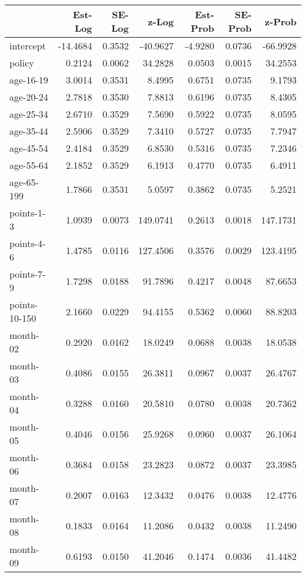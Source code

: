 \documentclass[10pt]{article}
\begin{document}
\begin{table}[ht]
\centering
\begin{tabular}{lrrrrrr}
  \hline
 & Est-Log & SE-Log & z-Log & Est-Prob & SE-Prob & z-Prob \\ 
  \hline
intercept & -14.4684 & 0.3532 & -40.9627 & -4.9280 & 0.0736 & -66.9928 \\ 
  policy & 0.2124 & 0.0062 & 34.2828 & 0.0503 & 0.0015 & 34.2553 \\ 
  age-16-19 & 3.0014 & 0.3531 & 8.4995 & 0.6751 & 0.0735 & 9.1793 \\ 
  age-20-24 & 2.7818 & 0.3530 & 7.8813 & 0.6196 & 0.0735 & 8.4305 \\ 
  age-25-34 & 2.6710 & 0.3529 & 7.5690 & 0.5922 & 0.0735 & 8.0595 \\ 
  age-35-44 & 2.5906 & 0.3529 & 7.3410 & 0.5727 & 0.0735 & 7.7947 \\ 
  age-45-54 & 2.4184 & 0.3529 & 6.8530 & 0.5316 & 0.0735 & 7.2346 \\ 
  age-55-64 & 2.1852 & 0.3529 & 6.1913 & 0.4770 & 0.0735 & 6.4911 \\ 
  age-65-199 & 1.7866 & 0.3531 & 5.0597 & 0.3862 & 0.0735 & 5.2521 \\ 
  points-1-3 & 1.0939 & 0.0073 & 149.0741 & 0.2613 & 0.0018 & 147.1731 \\ 
  points-4-6 & 1.4785 & 0.0116 & 127.4506 & 0.3576 & 0.0029 & 123.4195 \\ 
  points-7-9 & 1.7298 & 0.0188 & 91.7896 & 0.4217 & 0.0048 & 87.6653 \\ 
  points-10-150 & 2.1660 & 0.0229 & 94.4155 & 0.5362 & 0.0060 & 88.8203 \\ 
  month-02 & 0.2920 & 0.0162 & 18.0249 & 0.0688 & 0.0038 & 18.0538 \\ 
  month-03 & 0.4086 & 0.0155 & 26.3811 & 0.0967 & 0.0037 & 26.4767 \\ 
  month-04 & 0.3288 & 0.0160 & 20.5810 & 0.0780 & 0.0038 & 20.7362 \\ 
  month-05 & 0.4046 & 0.0156 & 25.9268 & 0.0960 & 0.0037 & 26.1064 \\ 
  month-06 & 0.3684 & 0.0158 & 23.2823 & 0.0872 & 0.0037 & 23.3985 \\ 
  month-07 & 0.2007 & 0.0163 & 12.3432 & 0.0476 & 0.0038 & 12.4776 \\ 
  month-08 & 0.1833 & 0.0164 & 11.2086 & 0.0432 & 0.0038 & 11.2490 \\ 
  month-09 & 0.6193 & 0.0150 & 41.2046 & 0.1474 & 0.0036 & 41.4482 \\ 

\end{tabular}
\end{table}
\end{document}
